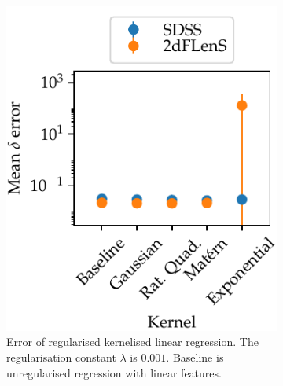 \documentclass[11pt,twoside,openright]{report}
\begin{document}
\begin{figure}
  \begin{subfigure}{0.4\textwidth}
    \centering
    \includegraphics[width=\textwidth]{linreg_kernelised_regularised.pdf}
    \caption{Error of regularised kernelised linear regression. The regularisation constant $\lambda$ is $0.001$. Baseline is unregularised regression with linear features.}
    \label{fig:linreg_kernelised_regularised}
  \end{subfigure}\hspace{0.1\textwidth}
  \begin{subfigure}{0.4\textwidth}
    \centering

\end{subfigure}
\end{figure}
\end{document}
